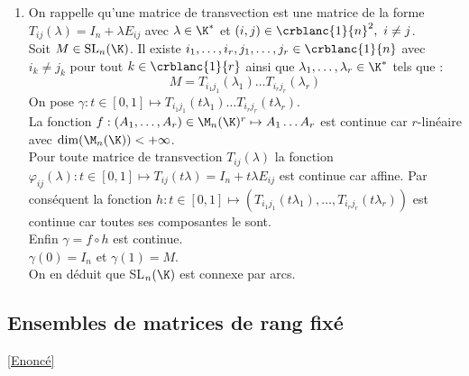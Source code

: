 \documentclass{book}
\begin{document}
\begin{enumerate}
		On en déduit que SL$_n(\K)$ est d'intérieur vide.
		\item On rappelle qu'une matrice de transvection est une matrice de la forme\\
		$T_{ij}(\lambda)=I_n+\lambda E_{ij}$ avec $\lambda\in \K^*$ et $(i,j)\in\crblanc{1}{n}^2,\ i\ne j$.\\
		Soit $M\in \text{SL}_n(\K)$. Il existe $i_1,\dots,i_r,j_1,\dots,j_r\in \crblanc{1}{n}$ avec $i_k\ne j_k$ pour tout $k\in \crblanc{1}{r}$ ainsi que $\lambda_1,\dots,\lambda_r\in \K^*$ tels que :\\
		$$M=T_{i_1j_1}(\lambda_1)\dots T_{i_rj_r}(\lambda_r)$$
		On pose $\gamma:t\in [0,1]\mapsto T_{i_1j_1}(t\lambda_1)\dots T_{i_rj_r}(t\lambda_r)$.\\
		La fonction $f:(A_1,\dots,A_r)\in\M_n(\K)^r\mapsto A_1\dots A_r$ est continue car $r$-linéaire avec $\dim(\M_n(\K))<+\infty$.\\
		Pour toute matrice de transvection $T_{ij}(\lambda)$ la fonction $\varphi_{ij}(\lambda) :t\in [0,1]\mapsto T_{ij}(t\lambda)=I_n+t\lambda E_{ij}$ est continue car affine. Par conséquent la fonction $h:t\in [0,1]\mapsto (T_{i_1j_1}(t\lambda_1),\dots,T_{i_rj_r}(t\lambda_r))$ est continue car toutes ses composantes le sont.\\
		Enfin $\gamma=f\circ h$ est continue.\\
		$\gamma(0)=I_n$ et $\gamma(1)=M$.\\
		On en déduit que SL$_n(\K)$ est connexe par arcs.
	\end{enumerate}
	
	\subsection{Ensembles de matrices de rang fixé}
	\label{sec:ensembles-de-matrices-de-rang-fixe}
	\textcolor{blue}{\hyperref[Ensembles de matroces de rang fixé]{[Enoncé]}}\\
	
\end{document}
